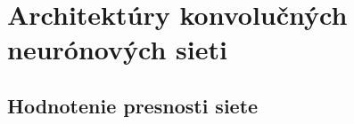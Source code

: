
\section{Architektúry konvolučných neurónových sieti}
\label{sec:architekuraCNN}


\subsection{Hodnotenie presnosti siete}

\begin{comment}

    - Pridat ake optimalizatory a celkovo s akymi argumetmi spustat trenovanie, kolko epoch a pod...
    - Zdovodnovat preco prave taketo nastavenie konvolucnej siete.
    - pocet epoch bude potrebne zistit experimentalnych sposobom, alebo pouzit funkciu na save best of Keras-u

\end{comment}
